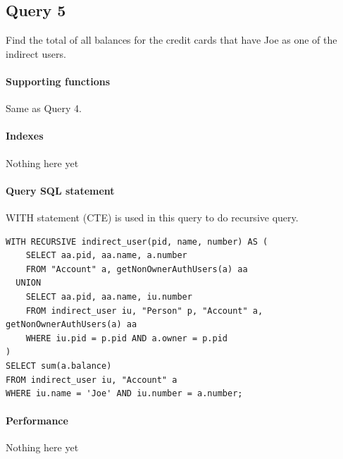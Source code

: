 \documentclass[11pt]{article}
\begin{document}
\subsection{Query 5}
Find the total of all balances for the credit cards that have Joe as one of the indirect users.

\paragraph{Supporting functions} Same as Query 4.

\paragraph{Indexes} Nothing here yet

\paragraph{Query SQL statement} WITH statement (CTE) is used in this query to do recursive query.
\begin{verbatim}
WITH RECURSIVE indirect_user(pid, name, number) AS (
    SELECT aa.pid, aa.name, a.number
    FROM "Account" a, getNonOwnerAuthUsers(a) aa
  UNION
    SELECT aa.pid, aa.name, iu.number
    FROM indirect_user iu, "Person" p, "Account" a, getNonOwnerAuthUsers(a) aa
    WHERE iu.pid = p.pid AND a.owner = p.pid
)
SELECT sum(a.balance)
FROM indirect_user iu, "Account" a
WHERE iu.name = 'Joe' AND iu.number = a.number;
\end{verbatim}

\paragraph{Performance} Nothing here yet
\end{document}

